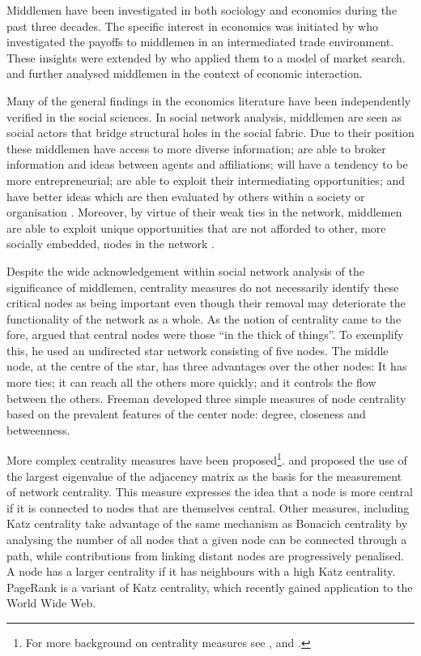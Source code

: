 \documentclass[11pt,fleqn]{article}
\begin{document}
Middlemen have been investigated in both sociology and economics during the past three decades. The specific interest in economics was initiated by \citet{KalaiMiddlemen1978} who investigated the payoffs to middlemen in an intermediated trade environment. These insights were extended by \citet{RubinsteinWolinsky1987} who applied them to a model of market search. \citet{JacksonWolinsky1996} and \citet{GillesChakrabarti2006} further analysed middlemen in the context of economic interaction.

Many of the general findings in the economics literature have been independently verified in the social sciences. In social network analysis, middlemen are seen as social actors that bridge structural holes in the social fabric. Due to their position these middlemen have access to more diverse information; are able to broker information and ideas between agents and affiliations; will have a tendency to be more entrepreneurial; are able to exploit their intermediating opportunities; and have better ideas which are then evaluated by others within a society or organisation \citep{Burt1992, Burt2004, Burt2005, Burt2010}. Moreover, by virtue of their weak ties in the network, middlemen are able to exploit unique opportunities that are not afforded to other, more socially embedded, nodes in the network \citep{Granovetter1973, Granovetter2005}.

Despite the wide acknowledgement within social network analysis of the significance of middlemen, centrality measures do not necessarily identify these critical nodes as being important even though their removal may deteriorate the functionality of the network as a whole. As the notion of centrality came to the fore, \citet[p.~219]{Freeman1979} argued that central nodes were those ``in the thick of things''. To exemplify this, he used an undirected star network consisting of five nodes. The middle node, at the centre of the star, has three advantages over the other nodes: It has more ties; it can reach all the others more quickly; and it controls the flow between the others. Freeman developed three simple measures of node centrality based on the prevalent features of the center node: degree, closeness and betweenness.

More complex centrality measures have been proposed\footnote{For more background on centrality measures see \citet{Borgatti2005}, \citet[Chapter~4]{WassermanFaust1994} and \citet[Chapter~2.2]{Jackson2008}.}. \citet{Bonacich1972,Bonacich1987} and \citet{Bonacich2001} proposed the use of the largest eigenvalue of the adjacency matrix as the basis for the measurement of network centrality. This measure expresses the idea that a node is more central if it is connected to nodes that are themselves central. Other measures, including Katz centrality \citep{Katz1953} take advantage of the same mechanism as Bonacich centrality by analysing the number of all nodes that a given node can be connected through a path, while contributions from linking distant nodes are progressively penalised. A node has a larger centrality if it has neighbours with a high Katz centrality. PageRank \citep{BrinPage1998} is a variant of Katz centrality, which recently gained application to the World Wide Web.
\end{document}
